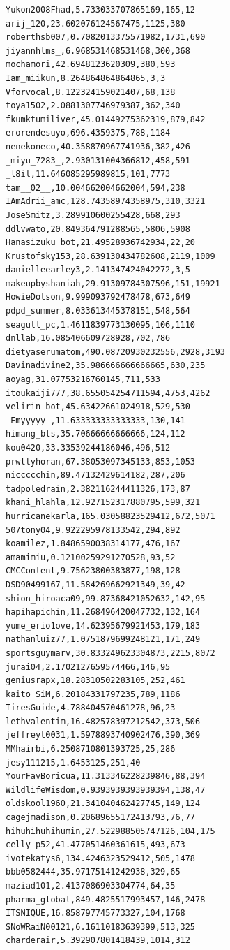 \begin{verbatim}
Yukon2008Fhad,5.733033707865169,165,12
arij_120,23.602076124567475,1125,380
roberthsb007,0.7082013375571982,1731,690
jiyannhlms_,6.968531468531468,300,368
mochamori,42.6948123620309,380,593
Iam_miikun,8.264864864864865,3,3
Vforvocal,8.122324159021407,68,138
toya1502,2.0881307746979387,362,340
fkumktumiliver,45.01449275362319,879,842
erorendesuyo,696.4359375,788,1184
nenekoneco,40.358870967741936,382,426
_miyu_7283_,2.930131004366812,458,591
_l8il,11.646085295989815,101,7773
tam__02__,10.004662004662004,594,238
IAmAdrii_amc,128.74358974358975,310,3321
JoseSmitz,3.289910600255428,668,293
ddlvwato,20.849364791288565,5806,5908
Hanasizuku_bot,21.49528936742934,22,20
Krustofsky153,28.639130434782608,2119,1009
danielleearley3,2.141347424042272,3,5
makeupbyshaniah,29.91309784307596,151,19921
HowieDotson,9.999093792478478,673,649
pdpd_summer,8.033613445378151,548,564
seagull_pc,1.4611839773130095,106,1110
dnllab,16.085406609728928,702,786
dietyaserumatom,490.08720930232556,2928,3193
Davinadivine2,35.986666666666665,630,235
aoyag,31.07753216760145,711,533
itoukaiji777,38.655054254711594,4753,4262
velirin_bot,45.63422661024918,529,530
_Emyyyyy_,11.633333333333333,130,141
himang_bts,35.70666666666666,124,112
kou0420,33.33539244186046,496,512
prwttyhoran,67.38053097345133,853,1053
niccccchin,89.47132429614182,287,206
tadpoledrain,2.382116244411326,173,87
khani_hlahla,12.927152317880795,599,321
hurricanekarla,165.03058823529412,672,5071
507tony04,9.922295978133542,294,892
koamilez,1.8486590038314177,476,167
amamimiu,0.12100259291270528,93,52
CMCContent,9.75623800383877,198,128
DSD90499167,11.584269662921349,39,42
shion_hiroaca09,99.87368421052632,142,95
hapihapichin,11.268496420047732,132,164
yume_erio1ove,14.62395679921453,179,183
nathanluiz77,1.0751879699248121,171,249
sportsguymarv,30.833249623304873,2215,8072
jurai04,2.1702127659574466,146,95
geniusrapx,18.28310502283105,252,461
kaito_SiM,6.20184331797235,789,1186
TiresGuide,4.788404570461278,96,23
lethvalentim,16.482578397212542,373,506
jeffreyt0031,1.5978893740902476,390,369
MMhairbi,6.2508710801393725,25,286
jesy111215,1.6453125,251,40
YourFavBoricua,11.313346228239846,88,394
WildlifeWisdom,0.9393939393939394,138,47
oldskool1960,21.341040462427745,149,124
cagejmadison,0.20689655172413793,76,77
hihuhihuhihumin,27.522988505747126,104,175
celly_p52,41.477051460361615,493,673
ivotekatys6,134.4246323529412,505,1478
bbb0582444,35.97175141242938,329,65
maziad101,2.4137086903304774,64,35
pharma_global,849.4825517993457,146,2478
ITSNIQUE,16.858797745773327,104,1768
SNoWRaiN00121,6.16110183639399,513,325
charderair,5.392907801418439,1014,312

\end{verbatim}

